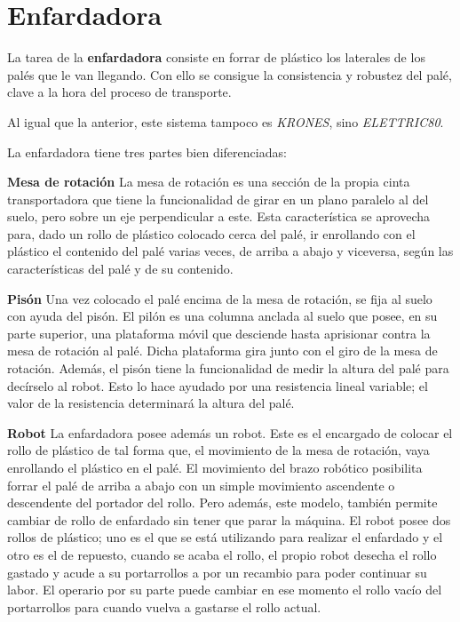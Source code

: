 \documentclass[11pt,a4paper,spanish,twoside]{report}
\begin{document}
\section{Enfardadora}
La tarea de la \textbf{enfardadora} consiste en forrar de plástico los 
laterales de los palés que le van llegando. Con ello se consigue la 
consistencia y robustez del palé, clave a la hora del proceso de transporte.

Al igual que la anterior, este sistema tampoco es \emph{KRONES}, sino 
\emph{ELETTRIC80}.

La enfardadora tiene tres partes bien diferenciadas:
\begin{description}
\item \textbf{Mesa de rotación}
La mesa de rotación es una sección de la propia cinta transportadora que tiene 
la funcionalidad de girar en un plano paralelo al del suelo, pero sobre un eje 
perpendicular a este. Esta característica se aprovecha para, dado un rollo de 
plástico colocado cerca del palé, ir enrollando con el plástico el contenido 
del palé varias veces, de arriba a abajo y viceversa, según las 
características del palé y de su contenido.
\item \textbf{Pisón}
Una vez colocado el palé encima de la mesa de rotación, se fija al suelo con 
ayuda del pisón. El pilón es una columna anclada al suelo que posee, en su 
parte superior, una plataforma móvil que desciende hasta aprisionar contra la
mesa de rotación al palé. Dicha plataforma gira junto con el giro de la mesa de
rotación. Además, el pisón tiene la funcionalidad de medir la altura del palé 
para decírselo al robot. Esto lo hace ayudado por una resistencia lineal
variable; el valor de la resistencia determinará la altura del palé.
\item \textbf{Robot}
La enfardadora posee además un robot. Este es el encargado de colocar el rollo 
de plástico de tal forma que, el movimiento de la mesa de rotación, vaya 
enrollando el plástico en el palé. El movimiento del brazo robótico posibilita 
forrar el palé de arriba a abajo con un simple movimiento ascendente o 
descendente del portador del rollo. Pero además, este modelo, también permite 
cambiar de rollo de enfardado sin tener que parar la máquina. El robot posee 
dos rollos de plástico; uno es el que se está utilizando para realizar el 
enfardado y el otro es el de repuesto, cuando se acaba el rollo, el propio 
robot desecha el rollo gastado y acude a su portarrollos a por un recambio para
poder continuar su labor. El operario por su parte puede cambiar en ese momento
el rollo vacío del portarrollos para cuando vuelva a gastarse el rollo actual.
\end{description}
\end{document}
